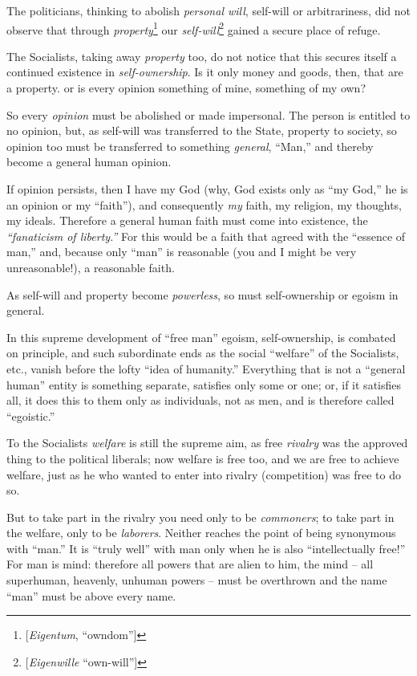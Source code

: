 The politicians, thinking to abolish \textit{personal will}, self-will or 
arbitrariness, did not observe that through 
\textit{property}\footnote{[\textit{Eigentum}, ``owndom'']} our 
\textit{self-will}\footnote{[\textit{Eigenwille} ``own-will'']} gained a 
secure place of refuge.

The Socialists, taking away \textit{property} too, do not notice that this 
secures itself a continued existence in \textit{self-ownership}. Is it only 
money and goods, then, that are a property. or is every opinion something of 
mine, something of my own?

So every \textit{opinion} must be abolished or made impersonal. The person is 
entitled to no opinion, but, as self-will was transferred to the State, 
property to society, so opinion too must be transferred to something 
\textit{general}, ``Man,'' and thereby become a general human opinion.

If opinion persists, then I have my God (why, God exists only as ``my God,'' 
he is an opinion or my ``faith''), and consequently \textit{my} faith, my 
religion, my thoughts, my ideals. Therefore a general human faith must come 
into existence, the \textit{``fanaticism of liberty.''} For this would be a 
faith that agreed with the ``essence of man,'' and, because only ``man'' 
is reasonable (you and I might be very unreasonable!), a reasonable faith.

As self-will and property become \textit{powerless}, so must self-ownership or 
egoism in general.

In this supreme development of ``free man'' egoism, self-ownership, is 
combated on principle, and such subordinate ends as the social ``welfare'' 
of the Socialists, etc., vanish before the lofty ``idea of humanity.'' 
Everything that is not a ``general human'' entity is something separate, 
satisfies only some or one; or, if it satisfies all, it does this to them only 
as individuals, not as men, and is therefore called ``egoistic.''

To the Socialists \textit{welfare} is still the supreme aim, as free 
\textit{rivalry} was the approved thing to the political liberals; now welfare 
is free too, and we are free to achieve welfare, just as he who wanted to 
enter into rivalry (competition) was free to do so.

But to take part in the rivalry you need only to be \textit{commoners}; to 
take part in the welfare, only to be \textit{laborers}. Neither reaches the 
point of being synonymous with ``man.'' It is ``truly well'' with man only 
when he is also ``intellectually free!'' For man is mind: therefore all 
powers that are alien to him, the mind -- all superhuman, heavenly, unhuman 
powers -- must be overthrown and the name ``man'' must be above every name.

